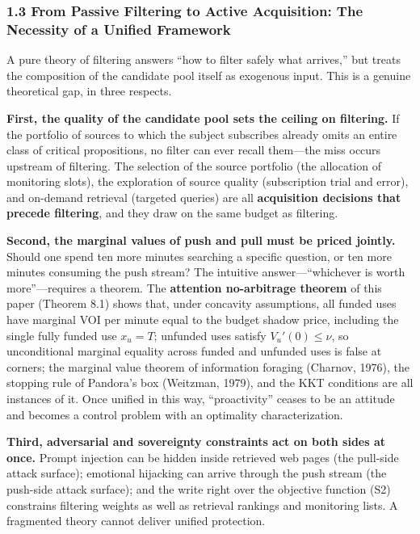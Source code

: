 \documentclass[
  11pt]{article}
\begin{document}
\subsubsection{1.3 From Passive Filtering to Active Acquisition: The
Necessity of a Unified
Framework}\label{from-passive-filtering-to-active-acquisition-the-necessity-of-a-unified-framework}

A pure theory of filtering answers ``how to filter safely what
arrives,'' but treats the composition of the candidate pool itself as
exogenous input. This is a genuine theoretical gap, in three respects.

\textbf{First, the quality of the candidate pool sets the ceiling on
filtering.} If the portfolio of sources to which the subject subscribes
already omits an entire class of critical propositions, no filter can
ever recall them---the miss occurs upstream of filtering. The selection
of the source portfolio (the allocation of monitoring slots), the
exploration of source quality (subscription trial and error), and
on-demand retrieval (targeted queries) are all \textbf{acquisition
decisions that precede filtering}, and they draw on the same budget as
filtering.

\textbf{Second, the marginal values of push and pull must be priced
jointly.} Should one spend ten more minutes searching a specific
question, or ten more minutes consuming the push stream? The intuitive
answer---``whichever is worth more''---requires a theorem. The
\textbf{attention no-arbitrage theorem} of this paper (Theorem 8.1)
shows that, under concavity assumptions, all funded uses have marginal
VOI per minute equal to the budget shadow price, including the single
fully funded use \(x_u=T\); unfunded uses satisfy \(V_u'(0)\le\nu\), so
unconditional marginal equality across funded and unfunded uses is false
at corners; the marginal value theorem of information foraging (Charnov,
1976), the stopping rule of Pandora's box (Weitzman, 1979), and the KKT
conditions are all instances of it. Once unified in this way,
``proactivity'' ceases to be an attitude and becomes a control problem
with an optimality characterization.

\textbf{Third, adversarial and sovereignty constraints act on both sides
at once.} Prompt injection can be hidden inside retrieved web pages (the
pull-side attack surface); emotional hijacking can arrive through the
push stream (the push-side attack surface); and the write right over the
objective function (S2) constrains filtering weights as well as
retrieval rankings and monitoring lists. A fragmented theory cannot
deliver unified protection.
\end{document}
